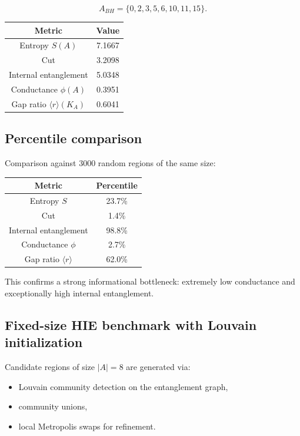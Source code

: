 \documentclass[11pt]{article}
\begin{document}
\[
A_{BH}=\{0,2,3,5,6,10,11,15\}.
\]

\begin{center}
\begin{tabular}{cc}
\toprule
Metric & Value \\
\midrule
Entropy $S(A)$          & 7.1667 \\
Cut                     & 3.2098 \\
Internal entanglement   & 5.0348 \\
Conductance $\phi(A)$  & 0.3951 \\
Gap ratio $\langle r\rangle(K_A)$ & 0.6041 \\
\bottomrule
\end{tabular}
\end{center}

\subsection{Percentile comparison}

Comparison against 3000 random regions of the same size:

\begin{center}
\begin{tabular}{cc}
\toprule
Metric & Percentile \\
\midrule
Entropy $S$        & 23.7\% \\
Cut                & 1.4\% \\
Internal entanglement & 98.8\% \\
Conductance $\phi$ & 2.7\% \\
Gap ratio $\langle r\rangle$ & 62.0\% \\
\bottomrule
\end{tabular}
\end{center}

This confirms a strong informational bottleneck: extremely low
conductance and exceptionally high internal entanglement.

\subsection{Fixed-size HIE benchmark with Louvain initialization}

Candidate regions of size $|A|=8$ are generated via:

\begin{itemize}
\item Louvain community detection on the entanglement graph,
\item community unions,
\item local Metropolis swaps for refinement.
\end{itemize}
\end{document}
